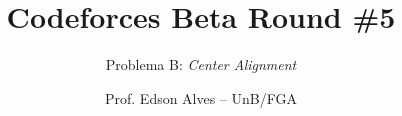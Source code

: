 \title{Codeforces Beta Round \#5}
\subtitle{Problema B: \it Center Alignment}
\author{Prof. Edson Alves -- UnB/FGA}
\date{}
